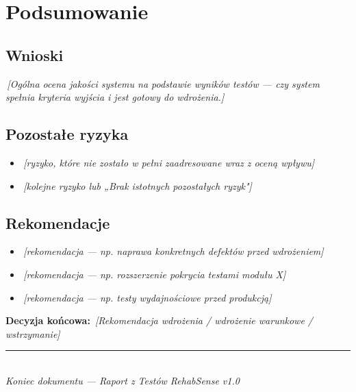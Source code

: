 \documentclass[11pt,a4paper]{article}
\newcommand{\luka}[1]{\colorbox{lukacol}{\,\textit{[#1]}\,}}
\begin{document}
\section{Podsumowanie}

\subsection{Wnioski}
\luka{Ogólna ocena jakości systemu na podstawie wyników testów — czy system spełnia kryteria wyjścia i jest gotowy do wdrożenia.}

\subsection{Pozostałe ryzyka}
\begin{itemize}
  \item \luka{ryzyko, które nie zostało w pełni zaadresowane wraz z oceną wpływu}
  \item \luka{kolejne ryzyko lub „Brak istotnych pozostałych ryzyk"}
\end{itemize}

\subsection{Rekomendacje}
\begin{itemize}
  \item \luka{rekomendacja — np. naprawa konkretnych defektów przed wdrożeniem}
  \item \luka{rekomendacja — np. rozszerzenie pokrycia testami modułu X}
  \item \luka{rekomendacja — np. testy wydajnościowe przed produkcją}
\end{itemize}

\vspace{0.8cm}
\noindent\textbf{Decyzja końcowa:} \luka{Rekomendacja wdrożenia / wdrożenie warunkowe / wstrzymanie}

\vspace{1cm}
\begin{center}
\rule{0.5\textwidth}{0.4pt}\\
\small\textit{Koniec dokumentu — Raport z Testów RehabSense v1.0}
\end{center}
\end{document}
